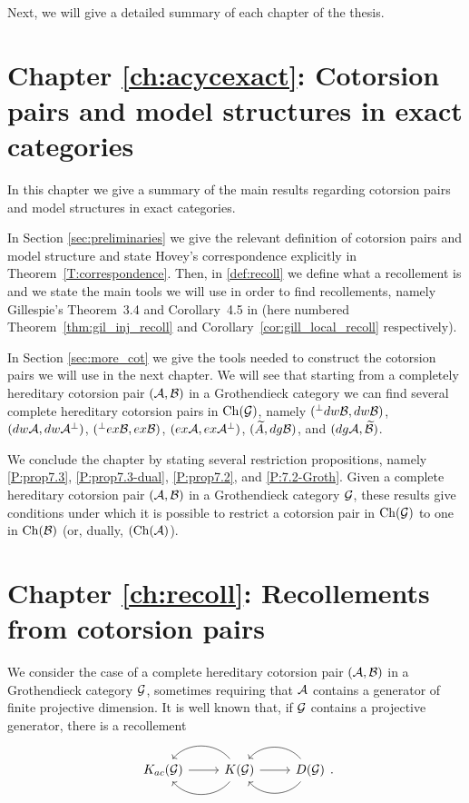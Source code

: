 Next, we will give a detailed summary of each chapter of the thesis.

\section*{Chapter \ref{ch:acycexact}: Cotorsion pairs and model structures in exact categories}

In this chapter we give a summary of the main results regarding cotorsion pairs and model structures in exact categories.

In Section \ref{sec:preliminaries} we give the relevant definition of cotorsion pairs and model structure and state Hovey's correspondence explicitly in Theorem~\ref{T:correspondence}.
Then, in \ref{def:recoll} we define what a recollement is and we state the main tools we will use in order to find recollements, namely Gillespie's Theorem~3.4 and Corollary~4.5 in \cite{G7} (here numbered Theorem~\ref{thm:gil_inj_recoll} and Corollary~\ref{cor:gill_local_recoll} respectively).

In Section \ref{sec:more_cot} we give the tools needed to construct the cotorsion pairs we will use in the next chapter. We will see that starting from a completely hereditary cotorsion pair $(\mathcal{A},\mathcal{B})$ in a Grothendieck category we can find several complete hereditary cotorsion pairs in $\mathrm{Ch}(\mathcal{G})$, namely $({^\perp dw\mathcal{B}},dw \mathcal{B})$, $(dw \mathcal{A},{dw \mathcal{A}^\perp})$, $({^\perp ex\mathcal{B}},ex \mathcal{B})$, $(ex\mathcal{A}, {ex\mathcal{A}^\perp})$, $(\widetilde{A},dg \mathcal{B})$, and $(dg \mathcal{A},\widetilde{\mathcal{B}})$.

We conclude the chapter by stating several restriction propositions, namely \ref{P:prop7.3}, \ref{P:prop7.3-dual}, \ref{P:prop7.2}, and \ref{P:7.2-Groth}. Given a complete hereditary cotorsion pair $(\mathcal{A},\mathcal{B})$ in a Grothendieck category $\mathcal{G}$, these results give conditions under which it is possible to restrict a cotorsion pair in $\mathrm{Ch}(\mathcal{G})$ to one in $\mathrm{Ch}(\mathcal{B})$ (or, dually, $(\mathrm{Ch}(\mathcal{A})$).

\section*{Chapter \ref{ch:recoll}: Recollements from cotorsion pairs}

We consider the case of a complete hereditary cotorsion pair $(\mathcal{A},\mathcal{B})$ in a Grothendieck category $\mathcal{G}$, sometimes requiring that $\mathcal{A}$ contains a generator of finite projective dimension. It is well known that, if $\mathcal{G}$ contains a projective generator, there is a recollement
\begin{equation*}
  \recdiagram{K_{ac}(\G)}{K(\G)}{D(\G)}.
\end{equation*}

